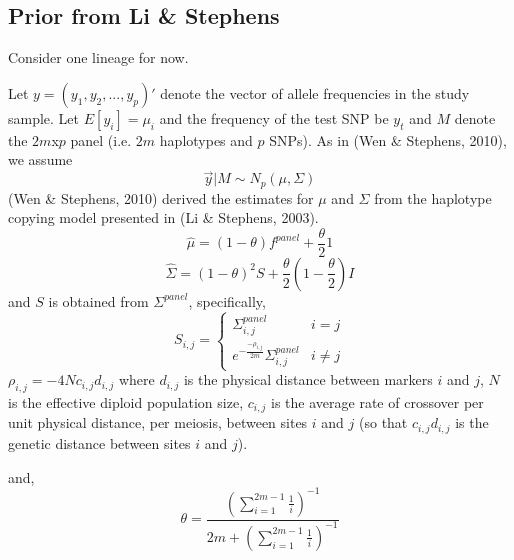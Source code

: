 \documentclass[10pt,a4paper,draft]{article}
\begin{document}
\subsection{Prior from Li \& Stephens}
Consider one lineage for now.

Let  $y = (y_1, y_2, ..., y_p)'$ denote the vector of allele frequencies in the study sample.
Let $E[y_{i}] = \mu_{i}$ and the frequency of the test SNP be $y_{t}$  and $M$ denote the $2m$x$p$ panel (i.e. $2m$ haplotypes and $p$ SNPs). As in (Wen \& Stephens, 2010), we assume 
\begin{equation}
\vec{y} |M \sim N_p(\mu, \Sigma) \label{eq:prior}
\end{equation}
(Wen \& Stephens, 2010) derived the estimates for $\mu$ and $\Sigma$ from the haplotype copying model presented in (Li \& Stephens, 2003).
\begin{equation}
\hat{\mu} = (1-\theta)f^{panel} + \frac{\theta}{2}1 
\end{equation}
\begin{equation}
\hat{\Sigma} = (1-\theta)^2S + \frac{\theta}{2}(1-\frac{\theta}{2})I
\end{equation}
and $S$ is obtained from $\Sigma^{panel}$, specifically,
 \begin{equation}
   S_{i,j} = \left\{
     \begin{array}{lr}
       \Sigma_{i,j}^{panel} &  i =j\\
       e^{-\frac{-\rho_{i,j}}{2m}} \Sigma_{i,j}^{panel} &  i \neq j
     \end{array}
   \right.
\end{equation} 
$\rho_{i,j} = -4Nc_{i,j}d_{i,j}$ where $d_{i,j}$ is the physical distance between markers $i$ and $j$, $N$ is the effective diploid population size, $c_{i,j}$ is the average rate of crossover per unit physical distance, per meiosis, between sites $i$ and $j$ (so that $c_{i,j}d_{i,j}$ is the genetic distance between sites $i$ and $j$). 

and,
\begin{equation}
\theta = \frac{(\sum_{i=1}^{2m-1} \frac{1}{i})^{-1}}{2m + (\sum_{i=1}^{2m-1} \frac{1}{i})^{-1}}
\end{equation}

\iffalse
The distribution of $\{y_j: j \neq t\}$ given the test SNP,
\begin{equation}
\{y_i: i \neq t\} | y_t \sim N_{p-1}(\bar{\mu}, \bar{\Sigma}) \label{cond}
\end{equation}
where
\begin{align*}
\bar{\mu} = \vec{\mu_{i \neq t}} + \Sigma_{i \neq t, t}\frac{1}{\sigma_t^2}(y_t-\mu_{t}) 
\end{align*}
and
\begin{align*}
\hat{\Sigma} = \Sigma_{i \neq t, i \neq t} - \Sigma_{i \neq t, t}\frac{1}{\sigma_t^2}\Sigma_{t, i \neq t}
\end{align*}
\fi
\end{document}
